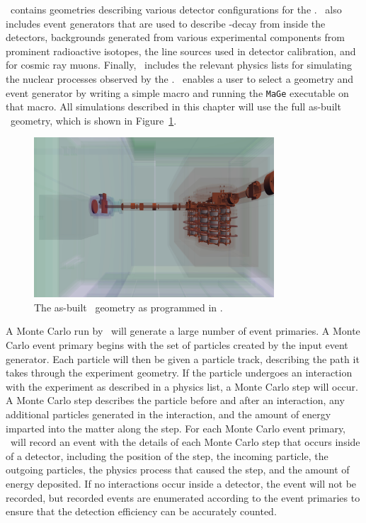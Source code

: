 \documentclass[/main.tex]{subfiles}
\begin{document}
\Mage\ contains geometries describing various detector configurations for the \MJD.
\Mage\ also includes event generators that are used to describe \bb-decay from inside the detectors, backgrounds generated from various experimental components from prominent radioactive isotopes, the line sources used in detector calibration, and for cosmic ray muons.
Finally, \Mage\ includes the relevant physics lists for simulating the nuclear processes observed by the \MJD.
\Mage\ enables a user to select a geometry and event generator by writing a simple macro and running the \texttt{MaGe} executable on that macro.
All simulations described in this chapter will use the full as-built \MJD\ geometry, which is shown in Figure~\ref{fig:mageasbuilt}.

\begin{figure}[h]
  \centering
  \includegraphics[width=0.8\textwidth]{Geant4Geom.jpeg}
  \caption[The \MJD\ as built simulated geometry]{\label{fig:mageasbuilt}
    The as-built \MJD\ geometry as programmed in \Mage.
  }
\end{figure}

A Monte Carlo run by \geant\ will generate a large number of event primaries.
A Monte Carlo event primary begins with the set of particles created by the input event generator.
Each particle will then be given a particle track, describing the path it takes through the experiment geometry.
If the particle undergoes an interaction with the experiment as described in a physics list, a Monte Carlo step will occur.
A Monte Carlo step describes the particle before and after an interaction, any additional particles generated in the interaction, and the amount of energy imparted into the matter along the step.
For each Monte Carlo event primary, \Mage\ will record an event with the details of each Monte Carlo step that occurs inside of a detector, including the position of the step, the incoming particle, the outgoing particles, the physics process that caused the step, and the amount of energy deposited.
If no interactions occur inside a detector, the event will not be recorded, but recorded events are enumerated according to the event primaries to ensure that the detection efficiency can be accurately counted.
\end{document}
